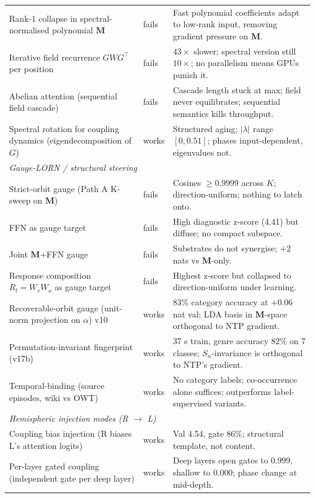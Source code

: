 \documentclass[11pt, a4paper]{article}
\newcommand{\M}{\mathbf{M}}
\newcommand{\rwin}{\cellcolor{rowgreen}}
\newcommand{\rloss}{\cellcolor{rowred}}
\begin{document}
\begin{small}
\begin{longtable}{p{4.2cm} p{1.5cm} p{8.6cm}}
\rloss Rank-1 collapse in spectral-normalised polynomial $\M$ & fails & Fast polynomial coefficients adapt to low-rank input, removing gradient pressure on $\M$. \\
\rloss Iterative field recurrence $G W G^\top$ per position & fails & $43\times$ slower; spectral version still $10\times$; no parallelism means GPUs punish it. \\
\rloss Abelian attention (sequential field cascade) & fails & Cascade length stuck at max; field never equilibrates; sequential semantics kills throughput. \\
\rwin Spectral rotation for coupling dynamics (eigendecomposition of $G$) & works & Structured aging; $|\lambda|$ range $[0, 0.51]$; phases input-dependent, eigenvalues not. \\
\midrule
\multicolumn{3}{l}{\textit{Gauge-LORN / structural steering}} \\
\midrule
\rloss Strict-orbit gauge (Path A K-sweep on $\M$) & fails & Cosines $\geq 0.9999$ across $K$; direction-uniform; nothing to latch onto. \\
\rloss FFN as gauge target & fails & High diagnostic z-score (4.41) but diffuse; no compact subspace. \\
\rloss Joint $\M$+FFN gauge & fails & Substrates do not synergise; $+2$ nats vs $\M$-only. \\
\rloss Response composition $R_l = W_v W_o$ as gauge target & fails & Highest z-score but collapsed to direction-uniform under learning. \\
\rwin Recoverable-orbit gauge (unit-norm projection on $\alpha$) v10 & works & 83\% category accuracy at $+0.06$ nat val; LDA basis in $\M$-space orthogonal to NTP gradient. \\
\rwin Permutation-invariant fingerprint (v17b) & works & 37 s train, genre accuracy 82\% on 7 classes; $S_n$-invariance is orthogonal to NTP's gradient. \\
\rwin Temporal-binding (source episodes, wiki vs OWT) & works & No category labels; co-occurrence alone suffices; outperforms label-supervised variants. \\
\midrule
\multicolumn{3}{l}{\textit{Hemispheric injection modes (R $\to$ L)}} \\
\midrule
\rwin Coupling bias injection (R biases L's attention logits) & works & Val 4.54, gate 86\%; structural template, not content. \\
\rwin Per-layer gated coupling (independent gate per deep layer) & works & Deep layers open gates to 0.999, shallow to 0.000; phase change at mid-depth. \\

\end{longtable}
\end{small}
\end{document}
